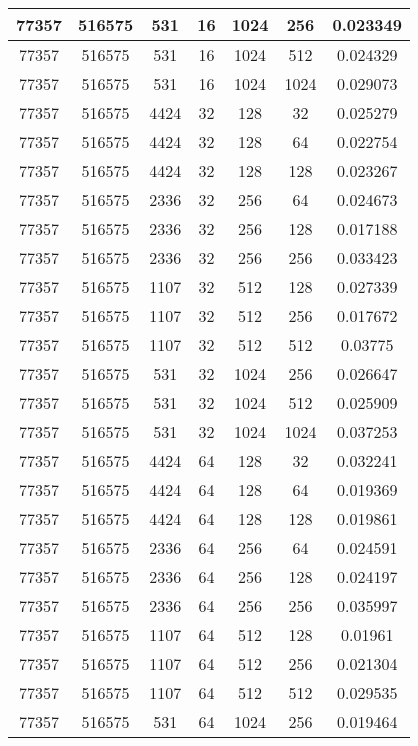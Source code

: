 \documentclass[9pt]{article}
\begin{document}
\begin{tabular}{|c|c|c|c|c|c|c| }
\hline
77357  & 516575  & 531  & 16  & 1024  & 256  & 0.023349 \\
\hline
77357  & 516575  & 531  & 16  & 1024  & 512  & 0.024329 \\
\hline
77357  & 516575  & 531  & 16  & 1024  & 1024  & 0.029073 \\
\hline
77357  & 516575  & 4424  & 32  & 128  & 32  & 0.025279 \\
\hline
77357  & 516575  & 4424  & 32  & 128  & 64  & 0.022754 \\
\hline
77357  & 516575  & 4424  & 32  & 128  & 128  & 0.023267 \\
\hline
77357  & 516575  & 2336  & 32  & 256  & 64  & 0.024673 \\
\hline
77357  & 516575  & 2336  & 32  & 256  & 128  & 0.017188 \\
\hline
77357  & 516575  & 2336  & 32  & 256  & 256  & 0.033423 \\
\hline
77357  & 516575  & 1107  & 32  & 512  & 128  & 0.027339 \\
\hline
77357  & 516575  & 1107  & 32  & 512  & 256  & 0.017672 \\
\hline
77357  & 516575  & 1107  & 32  & 512  & 512  & 0.03775 \\
\hline
77357  & 516575  & 531  & 32  & 1024  & 256  & 0.026647 \\
\hline
77357  & 516575  & 531  & 32  & 1024  & 512  & 0.025909 \\
\hline
77357  & 516575  & 531  & 32  & 1024  & 1024  & 0.037253 \\
\hline
77357  & 516575  & 4424  & 64  & 128  & 32  & 0.032241 \\
\hline
77357  & 516575  & 4424  & 64  & 128  & 64  & 0.019369 \\
\hline
77357  & 516575  & 4424  & 64  & 128  & 128  & 0.019861 \\
\hline
77357  & 516575  & 2336  & 64  & 256  & 64  & 0.024591 \\
\hline
77357  & 516575  & 2336  & 64  & 256  & 128  & 0.024197 \\
\hline
77357  & 516575  & 2336  & 64  & 256  & 256  & 0.035997 \\
\hline
77357  & 516575  & 1107  & 64  & 512  & 128  & 0.01961 \\
\hline
77357  & 516575  & 1107  & 64  & 512  & 256  & 0.021304 \\
\hline
77357  & 516575  & 1107  & 64  & 512  & 512  & 0.029535 \\
\hline
77357  & 516575  & 531  & 64  & 1024  & 256  & 0.019464 \\

\end{tabular}
\end{document}

